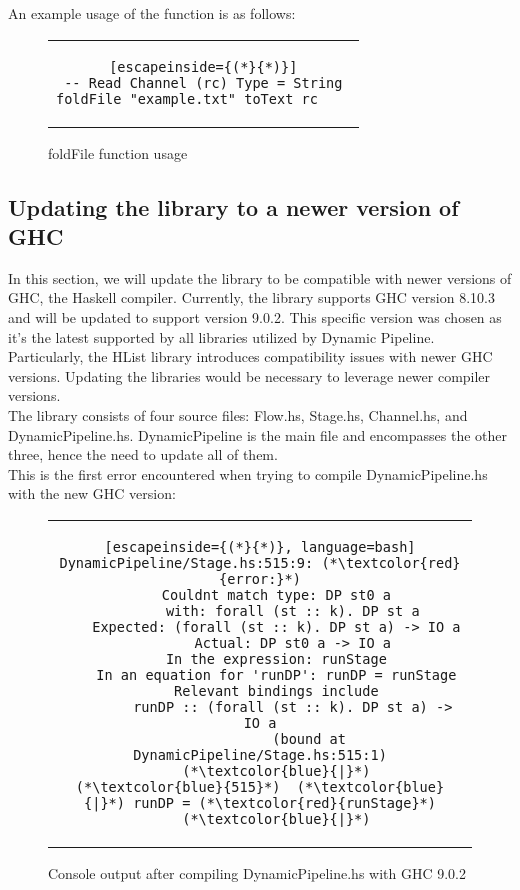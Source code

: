 An example usage of the function is as follows:

\begin{figure}[H]
    \begin{tabular}{c}
        \begin{lstlisting}[escapeinside={(*}{*)}]
-- Read Channel (rc) Type = String
foldFile "example.txt" toText rc	
        \end{lstlisting}
    \end{tabular}
    \caption{foldFile function usage}
    \label{fig:HC24b}
\end{figure}

\subsection{Updating the library to a newer version of GHC}
In this section, we will update the library to be compatible with newer versions of GHC, the Haskell compiler.
Currently, the library supports GHC version 8.10.3 and will be updated to support version 9.0.2.
This specific version was chosen as it's the latest supported by all libraries utilized by Dynamic Pipeline.
Particularly, the HList library introduces compatibility issues with newer GHC versions.
Updating the libraries would be necessary to leverage newer compiler versions.\\

The library consists of four source files: Flow.hs, Stage.hs, Channel.hs, and DynamicPipeline.hs.
DynamicPipeline is the main file and encompasses the other three, hence the need to update all of them.\\

This is the first error encountered when trying to compile DynamicPipeline.hs with the new GHC version:

\begin{figure}[H]
    \begin{tabular}{c}
        \begin{lstlisting}[escapeinside={(*}{*)}, language=bash]
DynamicPipeline/Stage.hs:515:9: (*\textcolor{red}{error:}*)
    Couldnt match type: DP st0 a
        with: forall (st :: k). DP st a
    Expected: (forall (st :: k). DP st a) -> IO a
        Actual: DP st0 a -> IO a
    In the expression: runStage
    In an equation for 'runDP': runDP = runStage
    Relevant bindings include
        runDP :: (forall (st :: k). DP st a) -> IO a
            (bound at DynamicPipeline/Stage.hs:515:1)
    (*\textcolor{blue}{|}*)
(*\textcolor{blue}{515}*)  (*\textcolor{blue}{|}*) runDP = (*\textcolor{red}{runStage}*)
    (*\textcolor{blue}{|}*)
        \end{lstlisting}
    \end{tabular}
    \caption{Console output after compiling DynamicPipeline.hs with GHC 9.0.2}
    \label{fig:HC25}
\end{figure}


